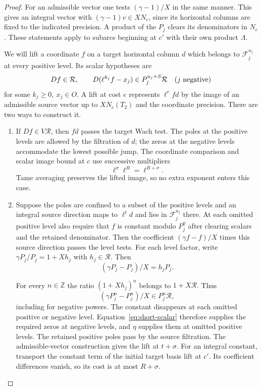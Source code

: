 \begin{proof}
For an admissible vector one tests
\((\gamma-1)/X\) in the same manner. This gives an integral
vector with \((\gamma-1)v\in XN_c\), since its horizontal
columns are fixed to the indicated precision. A product of the
\(P_j\) clears its denominators in \(N_c\). These statements
apply to subarcs beginning at \(c'\) with their own product
\(\Lambda\). \label{cor:inert-short-frame-1}

We will lift a coordinate \(f\) on a target horizontal column
\(d\) which belongs to \(\mathcal F_j^{u_j}\) at every positive
level. Its scalar hypotheses are
\begin{equation}\label{eq:short-scalar}
 Df\in\mathcal R,\qquad
 D(\ell^{k_j}f-x_j)\in P_j^{u_j+S}\mathcal R
 \quad(j\ {\rm negative})
\end{equation}
for some \(k_j\ge0,\ x_j\in O\). A lift at cost \(e\) represents
\(\ell^e f d\) by the image of an admissible source vector up to
\(XN_c(T_2)\) and the coordinate precision. There are two ways
to construct it.
\begin{enumerate}
\item If \(Df\in V\mathcal R\), then \(fd\) passes the target
Wach test. The poles at the positive levels are allowed by the
filtration of \(d\); the zeros at the negative levels accommodate
the lowest possible jump. The coordinate comparison and scalar image bound at \(c\) use successive multipliers
\[
 \ell^\sigma\ell^R=\ell^{R+\sigma}.
\]
Tame averaging preserves the lifted image, so no extra exponent enters this case.
\item Suppose the poles are confined to a subset of the positive
levels and an integral source direction maps to \(\ell^t d\) and
lies in \(\mathcal F_j^{u_j}\) there. At each omitted positive
level also require that \(f\) is constant modulo \(P_j^\eta\)
after clearing scalars and the retained denominator. Then the
coefficient \((\gamma f-f)/X\) times this source direction passes
the level tests. For each level factor, write \(\gamma P_j/P_j=1+Xh_j\) with \(h_j\in\mathcal R\). Then
\[
 (\gamma P_j-P_j)/X=h_jP_j.
\]

For every \(n\in\mathbb Z\) the ratio \((1+Xh_j)^n\) belongs to \(1+X\mathcal R\). Thus
\[
 (\gamma P_j^n-P_j^n)/X\in P_j^n\mathcal R ,
\]
including for negative powers. The constant disappears
at each omitted positive or negative level. Equation~\eqref{eq:short-scalar}
therefore supplies the required zeros at negative levels, and
\(\eta\) supplies them at omitted positive levels. The retained
positive poles pass by the source filtration. The admissible-vector
construction gives the lift at \(t+\sigma\). For an integral constant, transport the constant term of the initial target basis lift at \(c'\). Its coefficient differences vanish, so its cost is at most \(R+\sigma\).
\end{enumerate}


\end{proof}
